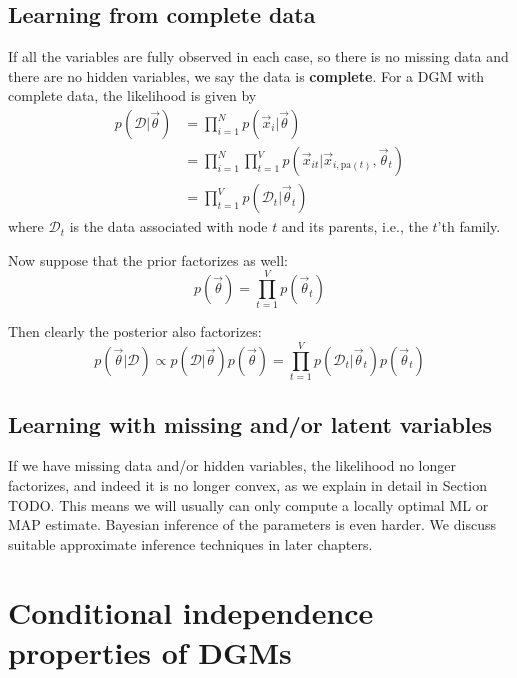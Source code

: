 \subsection{Learning from complete data}
If all the variables are fully observed in each case, so there is no missing data and there are no hidden variables, we say the data is \textbf{complete}. For a DGM with complete data, the likelihood is given by
\begin{equation}\begin{split}
p(\mathcal{D}|\vec{\theta}) & = \prod_{i=1}^N p(\vec{x}_i|\vec{\theta}) \\
& = \prod_{i=1}^N\prod_{t=1}^V p(\vec{x}_{it}|\vec{x}_{i, \mathrm{pa}(t)}, \vec{\theta}_t) \\
& = \prod_{t=1}^V p(\mathcal{D}_t|\vec{\theta}_t)
\end{split}\end{equation}
where $\mathcal{D}_t$ is the data associated with node $t$ and its parents, i.e., the $t$'th family.

Now suppose that the prior factorizes as well:
\begin{equation}
p(\vec{\theta})=\prod\limits_{t=1}^V p(\vec{\theta}_t)
\end{equation}

Then clearly the posterior also factorizes:
\begin{equation}
p(\vec{\theta}|\mathcal{D}) \propto p(\mathcal{D}|\vec{\theta})p(\vec{\theta}) = \prod\limits_{t=1}^V p(\mathcal{D}_t|\vec{\theta}_t)p(\vec{\theta}_t)
\end{equation}


\subsection{Learning with missing and/or latent variables}
If we have missing data and/or hidden variables, the likelihood no longer factorizes, and indeed it is no longer convex, as we explain in detail in Section TODO. This means we will usually can only compute a locally optimal ML or MAP estimate. Bayesian inference of the parameters is even harder. We discuss suitable approximate inference techniques in later chapters.


\section{Conditional independence properties of DGMs}


